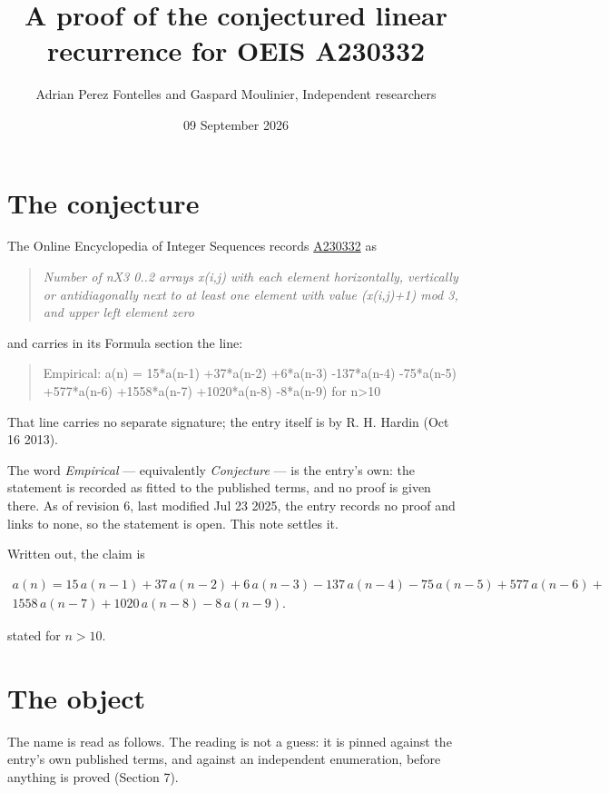 \documentclass[11pt]{article}
\title{A proof of the conjectured linear recurrence for OEIS A230332}
\author{Adrian Perez Fontelles and Gaspard Moulinier, Independent researchers}
\date{09 September 2026}
\theoremstyle{definition}
\begin{document}
\maketitle
\section{The conjecture}

The Online Encyclopedia of Integer Sequences records \href{https://oeis.org/A230332}{A230332} as

\begin{quote}\itshape Number of nX3 0..2 arrays x(i,j) with each element horizontally, vertically or antidiagonally next to at least one element with value (x(i,j)+1) mod 3, and upper left element zero\end{quote}

and carries in its Formula section the line:

\begin{quote}\ttfamily Empirical: a(n) = 15*a(n-1) +37*a(n-2) +6*a(n-3) -137*a(n-4) -75*a(n-5) +577*a(n-6) +1558*a(n-7) +1020*a(n-8) -8*a(n-9) for n>10\end{quote}

That line carries no separate signature; the entry itself is by R. H. Hardin (Oct 16 2013).

The word {\itshape Empirical} --- equivalently {\itshape Conjecture} --- is the entry's own: the statement is recorded as fitted to the published terms, and no proof is given there. As of revision 6, last modified Jul 23 2025, the entry records no proof and links to none, so the statement is open. This note settles it.

Written out, the claim is

\begin{multline*} a(n) = 15\,a(n-1) + 37\,a(n-2) + 6\,a(n-3) - 137\,a(n-4) - 75\,a(n-5) + 577\,a(n-6) + \\ 1558\,a(n-7) + 1020\,a(n-8) - 8\,a(n-9). \end{multline*}

stated for $n > 10$.

\section{The object}

The name is read as follows. The reading is not a guess: it is pinned against the entry's own published terms, and against an independent enumeration, before anything is proved (Section 7).
\end{document}
